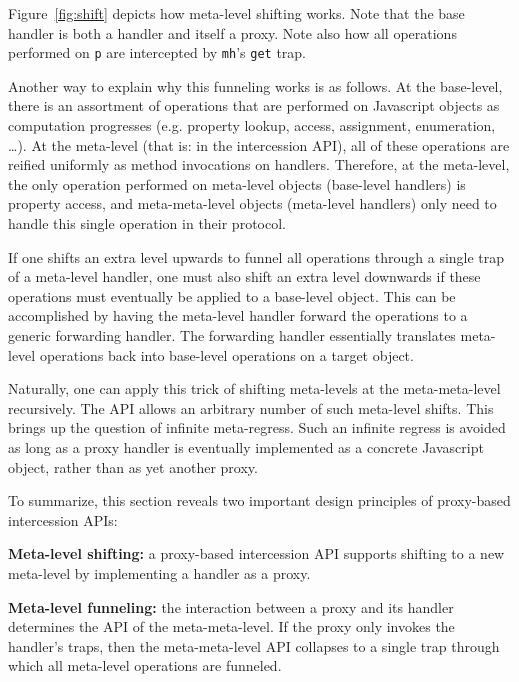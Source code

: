 \documentclass{sig-alternate}
\begin{document}
Figure~\ref{fig:shift} depicts how meta-level shifting works. Note that the base handler is both a handler and itself a proxy. Note also how all operations performed on \texttt{p} are intercepted by \texttt{mh}'s \texttt{get} trap.

Another way to explain why this funneling works is as follows. At the base-level, there is an assortment of operations that are performed on Javascript objects as computation progresses (e.g. property lookup, access, assignment, enumeration, \ldots). At the meta-level (that is: in the intercession API), all of these operations are reified uniformly as method invocations on handlers. Therefore, at the meta-level, the only operation performed on meta-level objects (base-level handlers) is property access, and meta-meta-level objects (meta-level handlers) only need to handle this single operation in their protocol.

If one shifts an extra level upwards to funnel all operations through a single trap of a meta-level handler, one must also shift an extra level downwards if these operations must eventually be applied to a base-level object. This can be accomplished by having the meta-level handler forward the operations to a generic forwarding handler. The forwarding handler essentially translates meta-level operations back into base-level operations on a target object.

Naturally, one can apply this trick of shifting meta-levels at the meta-meta-level recursively. The API allows an arbitrary number of such meta-level shifts. This brings up the question of infinite meta-regress. Such an infinite regress is avoided as long as a proxy handler is eventually implemented as a concrete Javascript object, rather than as yet another proxy.

To summarize, this section reveals two important design principles of proxy-based intercession APIs:

\textbf{Meta-level shifting:} a proxy-based intercession API supports shifting to a new meta-level by implementing a handler as a proxy.

\textbf{Meta-level funneling:} the interaction between a proxy and its handler determines the API of the meta-meta-level. If the proxy only invokes the handler's traps, then the meta-meta-level API collapses to a single trap through which all meta-level operations are funneled.
\end{document}
